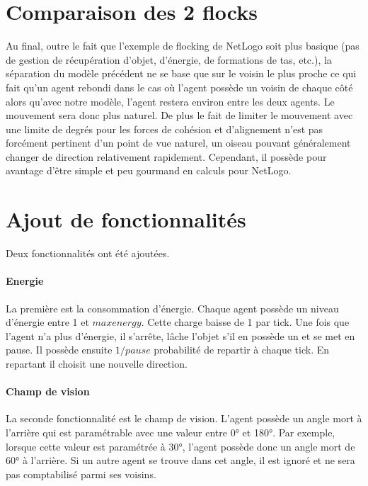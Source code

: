 \documentclass{article}
\begin{document}
\section{Comparaison des 2 flocks}
Au final, outre le fait que l'exemple de flocking de NetLogo soit plus basique (pas de gestion de récupération d'objet, d'énergie, de formations de tas, etc.), la séparation du modèle précédent ne se base que sur le voisin le plus proche ce qui fait qu'un agent rebondi dans le cas où l'agent possède un voisin de chaque côté alors qu'avec notre modèle, l'agent restera environ entre les deux agents. Le mouvement sera donc plus naturel.
De plus le fait de limiter le mouvement avec une limite de degrés pour les forces de cohésion et d'alignement n'est pas forcément pertinent d'un point de vue naturel, un oiseau pouvant généralement changer de direction relativement rapidement. Cependant, il possède pour avantage d'être simple et peu gourmand en calculs pour NetLogo.

\section{Ajout de fonctionnalités}

Deux fonctionnalités ont été ajoutées.

\paragraph{Energie}
La première est la consommation d'énergie. Chaque agent possède un niveau d'énergie entre 1 et $maxenergy$. Cette charge baisse de 1 par tick. Une fois que l'agent n'a plus d'énergie, il s'arrête, lâche l'objet s'il en possède un et se met en pause. Il possède ensuite $1/pause$ probabilité de repartir à chaque tick. En repartant il choisit une nouvelle direction.

\paragraph{Champ de vision}
La seconde fonctionnalité est le champ de vision. L'agent possède un angle mort à l'arrière qui est paramétrable avec une valeur entre 0° et 180°. Par exemple, lorsque cette valeur est paramétrée à 30°, l'agent possède donc un angle mort de 60° à l'arrière. Si un autre agent se trouve dans cet angle, il est ignoré et ne sera pas comptabilisé parmi ses voisins.
\end{document}
